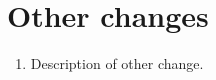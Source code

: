 \documentclass[11pt]{article}
\begin{document}

\section*{Other changes}

\begin{enumerate}[label={\color{black}O.\arabic*}]

  \item Description of other change.

\end{enumerate}

% 
% 
\end{document}
